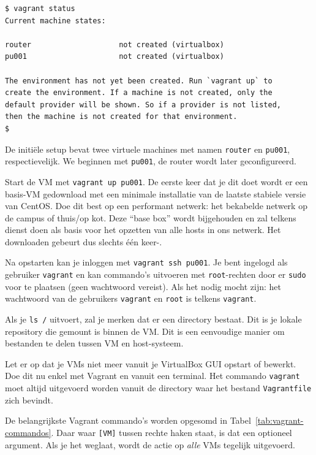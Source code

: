 \begin{verbatim}
$ vagrant status
Current machine states:

router                    not created (virtualbox)
pu001                     not created (virtualbox)

The environment has not yet been created. Run `vagrant up` to
create the environment. If a machine is not created, only the
default provider will be shown. So if a provider is not listed,
then the machine is not created for that environment.
$
\end{verbatim}

De initiële setup bevat twee virtuele machines met namen \texttt{router} en \texttt{pu001}, respectievelijk. We beginnen met \texttt{pu001}, de router wordt later geconfigureerd.

Start de VM met \texttt{vagrant\ up\ pu001}. De eerste keer dat je dit doet wordt er een basis-VM gedownload met een minimale installatie van de laatste stabiele versie van CentOS. Doe dit best op een performant netwerk: het bekabelde netwerk op de campus of thuis/op kot. Deze ``base box'' wordt bijgehouden en zal telkens dienst doen als basis voor het opzetten van alle hosts in ons netwerk. Het downloaden gebeurt dus slechts één keer-.

Na opstarten kan je inloggen met \texttt{vagrant\ ssh\ pu001}. Je bent ingelogd als gebruiker \texttt{vagrant} en kan commando's uitvoeren met \texttt{root}-rechten door er \texttt{sudo} voor te plaatsen (geen wachtwoord vereist). Als het nodig mocht zijn: het wachtwoord van de gebruikers \texttt{vagrant} en \texttt{root} is telkens \texttt{vagrant}.

Als je \texttt{ls\ /} uitvoert, zal je merken dat er een directory  bestaat. Dit is je lokale repository die gemount is binnen de VM. Dit is een eenvoudige manier om bestanden te delen tussen VM en host-systeem.

Let er op dat je VMs niet meer vanuit je VirtualBox GUI opstart of bewerkt. Doe dit nu enkel met Vagrant en vanuit een terminal. Het commando \texttt{vagrant} moet altijd uitgevoerd worden vanuit de directory waar het bestand \texttt{Vagrantfile} zich bevindt.

De belangrijkste Vagrant commando's worden opgesomd in Tabel~\ref{tab:vagrant-commandos}. Daar waar \texttt{[VM]} tussen rechte haken staat, is dat een optioneel argument. Als je het weglaat, wordt de actie op \emph{alle} VMs tegelijk uitgevoerd.

